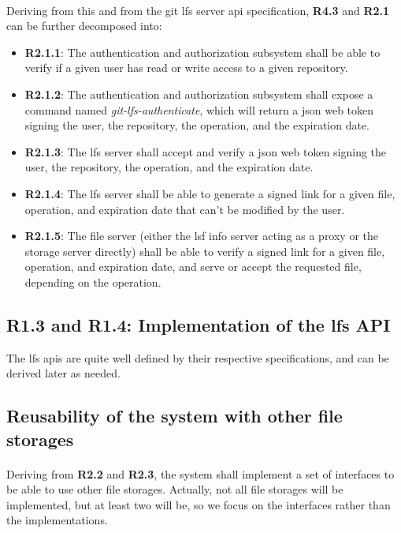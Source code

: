 \paragraph{}
Deriving from this and from the git lfs server api specification, \textbf{R4.3} and \textbf{R2.1} can be further decomposed into:

\begin{itemize}
    \item \textbf{R2.1.1}: The authentication and authorization subsystem shall be able to verify if a given user has read or write access to a given repository.
    \item \textbf{R2.1.2}: The authentication and authorization subsystem shall expose a command named \textit{git-lfs-authenticate}, which will return a json web token signing the user, the repository, the operation, and the expiration date.
    \item \textbf{R2.1.3}: The lfs server shall accept and verify a json web token signing the user, the repository, the operation, and the expiration date.
    \item \textbf{R2.1.4}: The lfs server shall be able to generate a signed link for a given file, operation, and expiration date that can't be modified by the user.
    \item \textbf{R2.1.5}: The file server (either the lsf info server acting as a proxy or the storage server directly) shall be able to verify a signed link for a given file, operation, and expiration date, and serve or accept the requested file, depending on the operation. 
\end{itemize}

\subsection{R1.3 and R1.4: Implementation of the lfs API}

The lfs apis are quite well defined by their respective specifications, and can be derived later as needed.

\subsection{Reusability of the system with other file storages}

\paragraph{}
Deriving from \textbf{R2.2} and \textbf{R2.3}, the system shall implement a set of interfaces to be able to use other file storages. Actually, not all file storages will be implemented, but at least two will be, so we focus on the interfaces rather than the implementations.


